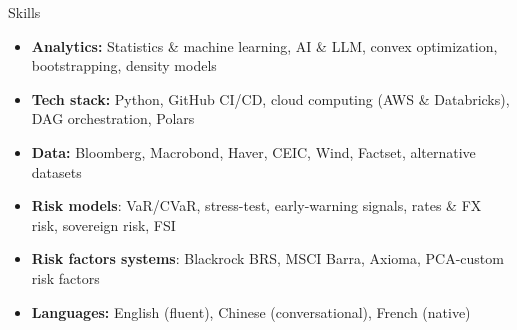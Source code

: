 \documentclass[usegeometry, 10pt, a4paper]{cv} %
\begin{document}
\newpage


\begin{rubriquetableau}[0.98\textwidth]{Skills}
  \vspace{-0.5cm}  
  \begin{itemize}
    \item \textbf{Analytics:} Statistics \& machine learning, AI \& LLM, convex optimization, bootstrapping, density models 
    \item \textbf{Tech stack:} Python, GitHub CI/CD, cloud computing (AWS \& Databricks), DAG orchestration, Polars
    \item \textbf{Data:} Bloomberg, Macrobond, Haver, CEIC, Wind, Factset, alternative datasets
    \item \textbf{Risk models}: VaR/CVaR, stress-test, early-warning signals, rates \& FX risk, sovereign risk, FSI 
    \item \textbf{Risk factors systems}: Blackrock BRS, MSCI Barra, Axioma, PCA-custom risk factors
    \item \textbf{Languages:} English (fluent), Chinese (conversational), French (native) 
  \end{itemize}
  \end{rubriquetableau}


\end{document}
